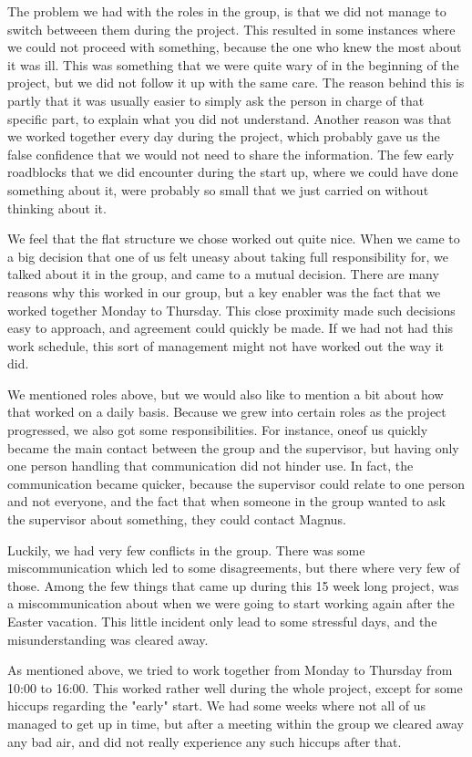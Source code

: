 The problem we had with the roles in the group, is that we did not manage to switch betweeen them during the project. This resulted in some instances where we could not proceed with something, because the one who knew the most about it was ill. This was something that we were quite wary of in the beginning of the project, but we did not follow it up with the same care. The reason behind this is partly that it was usually easier to simply ask the person in charge of that specific part, to explain what you did not understand. Another reason was that we worked together every day during the project, which probably gave us the false confidence that we would not need to share the information. The few early roadblocks that we did encounter during the start up, where we could have done something about it, were probably so small that we just carried on without thinking about it.

We feel that the flat structure we chose worked out quite nice. When we came to a big decision that one of us felt uneasy about taking full responsibility for, we talked about it in the group, and came to a mutual decision. There are many reasons why this worked in our group, but a key enabler was the fact that we worked together Monday to Thursday. This close proximity made such decisions easy to approach, and agreement could quickly be made. If we had not had this work schedule, this sort of management might not have worked out the way it did.

We mentioned roles above, but we would also like to mention a bit about how that worked on a daily basis. Because we grew into certain roles as the project progressed, we also got some responsibilities. For instance, oneof us quickly became the main contact between the group and the supervisor, but having only one person handling that communication did not hinder use. In fact, the communication became quicker, because the supervisor could relate to one person and not everyone, and the fact that when someone in the group wanted to ask the supervisor about something, they could contact Magnus.

Luckily, we had very few conflicts in the group. There was some miscommunication which led to some disagreements, but there where very few of those. Among the few things that came up during this 15 week long project, was a miscommunication about when we were going to start working again after the Easter vacation. This little incident only lead to some stressful days, and the misunderstanding was cleared away.

As mentioned above, we tried to work together from Monday to Thursday from 10:00 to 16:00. This worked rather well during the whole project, except for some hiccups regarding the "early" start. We had some weeks where not all of us managed to get up in time, but after a meeting within the group we cleared away any bad air, and did not really experience any such hiccups after that.
